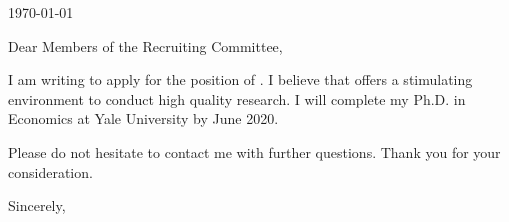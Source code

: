 \documentclass[12pt]{article}
\makeatletter
\newcommand\skipblank{\@ifstar\@spskip\@nlskip}
\newcommand\@nlskip[1]{\ifthenelse{\DTLiseq{#1}{}}{\relax}{#1\\}}
\newcommand\@spskip[1]{\ifthenelse{\DTLiseq{#1}{}}{\relax}{#1\space}}
\makeatother
\begin{document}

	\setcounter{page}{0}

	\hspace*{\fill} \name									\\
	\hspace*{\fill} \appaddressi \ \appaddressii \ \appaddressiii		\\
	\hspace*{\fill} \appcity \ \appstate \ \appzip					\\
	\hspace*{\fill} \phone									\\
	\hspace*{\fill} \email									\\


	\bigskip

	\today 

	\bigskip
	
	\skipblank{\institution}
	\skipblank{\dept}
	\skipblank{\addressi \ \addressii \ \addressiii}
	\skipblank{\city \ \state \ \zip}
	\skipblank{\country}



	Dear Members of the Recruiting Committee,

	I am writing to apply for the position of \position. I believe that \institution offers a stimulating environment to conduct high quality research. I will complete my Ph.D. in Economics at Yale University by June 2020.

	\body

	Please do not hesitate to contact me with further questions. Thank you for your consideration.

	\bigskip
	Sincerely,

	\name


	\clearpage
\end{document}
